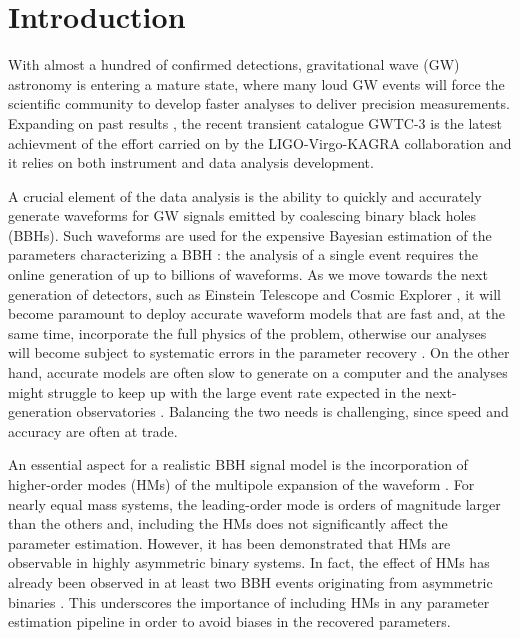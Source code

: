\documentclass[twocolumn,showpacs,preprintnumbers,nofootinbib,prd,
superscriptaddress,10pt]{revtex4-2}
\begin{document}
\section{Introduction}
\label{sec:intro}

With almost a hundred of confirmed detections, gravitational wave (GW) astronomy is entering a mature state, 
where many loud GW events will force the scientific community to develop faster analyses to deliver 
precision measurements. Expanding on past results \cite{LIGOScientific:2018mvr, LIGOScientific:2020ibl, LIGOScientific:2021usb}, 
the recent transient catalogue GWTC-3 \cite{KAGRA:2021vkt} is the latest achievment of the effort carried on by the 
LIGO-Virgo-KAGRA collaboration \cite{KAGRA:2013rdx, LIGOScientific:2014pky, VIRGO:2014yos, KAGRA:2020tym} 
and it relies on both instrument and data analysis development.

A crucial element of the data analysis is the ability to quickly and accurately generate waveforms for GW signals 
emitted by coalescing binary black holes (BBHs). Such waveforms are used for the expensive Bayesian estimation of 
the parameters characterizing a BBH \cite{Veitch:2014wba}: the analysis of a single event requires the online 
generation of up to billions of waveforms. As we move towards the next generation of detectors, such as Einstein Telescope 
\cite{Punturo:2010zz, Maggiore:2019uih} and Cosmic Explorer \cite{Reitze:2019iox, Evans:2021gyd}, it will become paramount to deploy accurate waveform models 
that are fast and, at the same time, incorporate the full physics of the problem, otherwise our analyses will  
become subject to systematic errors in the parameter recovery \cite{Purrer:2019jcp}. On the other hand, 
accurate models are often slow to generate on a computer and the analyses might struggle to keep up with the large 
event rate expected in the next-generation observatories  \cite{Samajdar:2021egv}.
Balancing the two needs is challenging, since speed and accuracy are often at trade.

An essential aspect for a realistic BBH signal model is the incorporation of higher-order modes (HMs) of the
multipole expansion of the waveform \cite{Maggiore:2007ulw}. For nearly equal mass systems, 
the leading-order mode is orders of magnitude larger than the others and, including the HMs does not 
significantly affect the parameter estimation. However, it has been demonstrated \cite{Varma:2014jxa, Varma:2016dnf, Roy:2019phx, Mills:2020thr} 
that HMs are observable in highly asymmetric binary systems. In fact, the effect of HMs has already been observed 
in at least two BBH events originating from asymmetric binaries \cite{LIGOScientific:2020stg, LIGOScientific:2020zkf}. This underscores the importance of including HMs in any parameter estimation pipeline in order to avoid biases in the recovered parameters.
\end{document}

